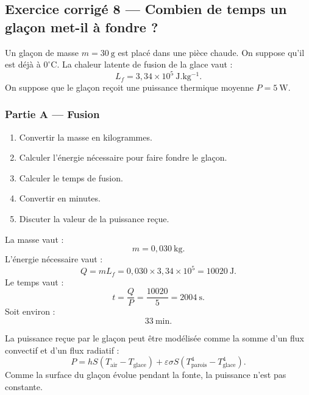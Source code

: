 \documentclass[11pt,a4paper]{article}
\begin{document}
\subsection{Exercice corrigé 8 — Combien de temps un glaçon met-il à fondre ?}

\begin{exercicebox}
Un glaçon de masse \(m=30\ \mathrm g\) est placé dans une pièce chaude. On suppose qu'il est déjà à \(0^\circ\mathrm C\). La chaleur latente de fusion de la glace vaut :
\[
L_f=3{,}34\times10^5\ \mathrm{J.kg^{-1}}.
\]
On suppose que le glaçon reçoit une puissance thermique moyenne \(P=5\ \mathrm W\).
\end{exercicebox}

\subsubsection*{Partie A — Fusion}

\begin{enumerate}
  \item Convertir la masse en kilogrammes.
  \item Calculer l'énergie nécessaire pour faire fondre le glaçon.
  \item Calculer le temps de fusion.
  \item Convertir en minutes.
  \item Discuter la valeur de la puissance reçue.
\end{enumerate}

\begin{corrigebox}
La masse vaut :
\[
m=0{,}030\ \mathrm{kg}.
\]
L'énergie nécessaire vaut :
\[
Q=mL_f=0{,}030\times3{,}34\times10^5=10020\ \mathrm J.
\]
Le temps vaut :
\[
t=\frac{Q}{P}=\frac{10020}{5}=2004\ \mathrm s.
\]
Soit environ :
\[
33\ \mathrm{min}.
\]
\end{corrigebox}

\begin{approfondissementbox}
La puissance reçue par le glaçon peut être modélisée comme la somme d'un flux convectif et d'un flux radiatif :
\[
P=hS(T_{\mathrm{air}}-T_{\mathrm{glace}})+\varepsilon\sigma S(T_{\mathrm{parois}}^4-T_{\mathrm{glace}}^4).
\]
Comme la surface du glaçon évolue pendant la fonte, la puissance n'est pas constante.
\end{approfondissementbox}

\end{document}
